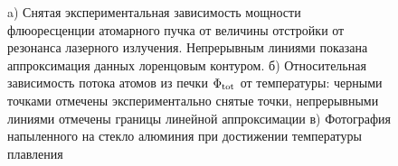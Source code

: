 \begin{figure}[ht]
    \centering
    \hspace{5 mm} 
    \vspace{-3mm}
    \caption{a) Снятая экспериментальная зависимость мощности флюоресценции атомарного пучка от величины отстройки от резонанса лазерного излучения. Непрерывным линиями показана аппроксимация данных лоренцовым контуром. б) Относительная зависимость потока атомов из печки $\Phi_{\textnormal{tot}}$ от температуры: черными точками отмечены экспериментально снятые точки, непрерывными линиями отмечены границы линейной аппроксимации  в) Фотография напыленного на стекло алюминия при достижении температуры плавления}
    \label{fig:oven}
\end{figure}


